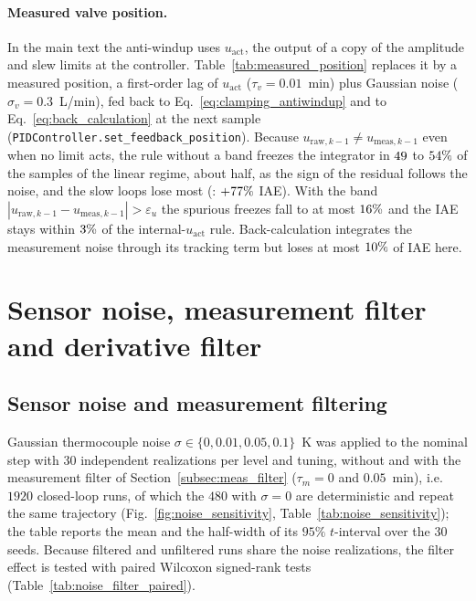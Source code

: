 \documentclass[11pt]{article}
\begin{document}


\paragraph{Measured valve position.} In the main text the anti-windup uses $u_{\text{act}}$, the output of a copy of the amplitude and slew limits at the controller. Table~\ref{tab:measured_position} replaces it by a measured position, a first-order lag of $u_{\text{act}}$ ($\tau_v = 0.01$~min) plus Gaussian noise ($\sigma_v = 0.3$~L/min), fed back to Eq.~\eqref{eq:clamping_antiwindup} and to Eq.~\eqref{eq:back_calculation} at the next sample (\texttt{PIDController.set\_feedback\_position}). Because $u_{\text{raw},k-1} \ne u_{\text{meas},k-1}$ even when no limit acts, the rule without a band freezes the integrator in $49$ to $54\%$ of the samples of the linear regime, about half, as the sign of the residual follows the noise, and the slow loops lose most (\vposworstloop{}: $+77\%$ IAE). With the band $|u_{\text{raw},k-1} - u_{\text{meas},k-1}| > \varepsilon_u$ the spurious freezes fall to at most $16\%$ and the IAE stays within $3\%$ of the internal-$u_{\text{act}}$ rule. Back-calculation integrates the measurement noise through its tracking term but loses at most $10\%$ of IAE here.



\section{Sensor noise, measurement filter and derivative filter}\label{supp:noise}
\subsection{Sensor noise and measurement filtering}
\label{subsec:noise_results}
Gaussian thermocouple noise $\sigma \in \{0, 0.01, 0.05, 0.1\}$~K was applied to the nominal step with $30$ independent realizations per level and tuning, without and with the measurement filter of Section~\ref{subsec:meas_filter} ($\tau_m = 0$ and $0.05$~min), i.e. $1920$ closed-loop runs, of which the $480$ with $\sigma = 0$ are deterministic and repeat the same trajectory (Fig.~\ref{fig:noise_sensitivity}, Table~\ref{tab:noise_sensitivity}); the table reports the mean and the half-width of its $95\%$ $t$-interval over the $30$ seeds. Because filtered and unfiltered runs share the noise realizations, the filter effect is tested with paired Wilcoxon signed-rank tests (Table~\ref{tab:noise_filter_paired}).
\end{document}
